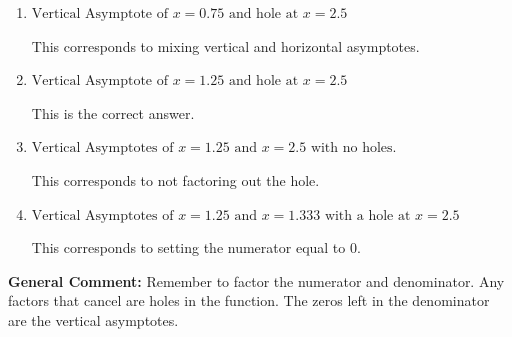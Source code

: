 \documentclass{extbook}[14pt]
\begin{document}
\begin{enumerate}
{\begin{enumerate}[label=\Alph*.]
This corresponds to considering where the denominator is equal to 0 as holes.
\item \( \text{Vertical Asymptote of } x = 0.75 \text{ and hole at } x = 2.5 \)

This corresponds to mixing vertical and horizontal asymptotes.
\item \( \text{Vertical Asymptote of } x = 1.25 \text{ and hole at } x = 2.5 \)

This is the correct answer.
\item \( \text{Vertical Asymptotes of } x = 1.25 \text{ and } x = 2.5 \text{ with no holes.} \)

This corresponds to not factoring out the hole.
\item \( \text{Vertical Asymptotes of } x = 1.25 \text{ and } x = 1.333 \text{ with a hole at } x = 2.5 \)

This corresponds to setting the numerator equal to 0.
\end{enumerate}

\textbf{General Comment:} Remember to factor the numerator and denominator. Any factors that cancel are holes in the function. The zeros left in the denominator are the vertical asymptotes.
}
\end{enumerate}
\end{document}
